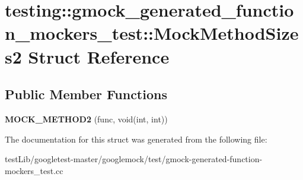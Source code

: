 \hypertarget{structtesting_1_1gmock__generated__function__mockers__test_1_1MockMethodSizes2}{}\section{testing\+:\+:gmock\+\_\+generated\+\_\+function\+\_\+mockers\+\_\+test\+:\+:Mock\+Method\+Sizes2 Struct Reference}
\label{structtesting_1_1gmock__generated__function__mockers__test_1_1MockMethodSizes2}
\subsection*{Public Member Functions}
\begin{DoxyCompactItemize}
\item 
\mbox{\label{structtesting_1_1gmock__generated__function__mockers__test_1_1MockMethodSizes2_a9200d3c0d5cbabb2bb93da4827b84260}} 
{\bfseries M\+O\+C\+K\+\_\+\+M\+E\+T\+H\+O\+D2} (func, void(int, int))
\end{DoxyCompactItemize}


The documentation for this struct was generated from the following file\+:\begin{DoxyCompactItemize}
\item 
test\+Lib/googletest-\/master/googlemock/test/gmock-\/generated-\/function-\/mockers\+\_\+test.\+cc\end{DoxyCompactItemize}
